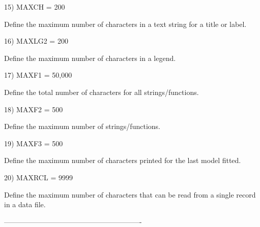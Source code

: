  15) MAXCH    = 200

     Define the maximum number of characters in a text string for a
     title or label.

 16) MAXLG2   = 200

     Define the maximum number of characters in a legend.

 17) MAXF1    = 50,000

     Define the total number of characters for all strings/functions.

 18) MAXF2    = 500

     Define the maximum number of strings/functions.

 19) MAXF3    = 500

     Define the maximum number of characters printed for the last
     model fitted.

 20) MAXRCL   = 9999

     Define the maximum number of characters that can be read from a
     single record in a data file.






----------------------------------------------------------

































































